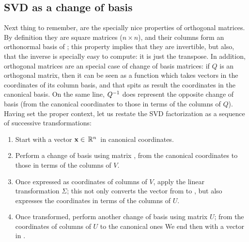 \subsection{SVD as a change of basis}

Next thing to remember, are the specially nice properties of orthogonal
matrices. By definition they are square matrices ($n \times n$), and
their columns form an orthonormal basis of ; this property
implies that they are invertible, but also, that the inverse is
specially easy to compute: it is just the transpose. In addition,
orthogonal matrices are an special case of change of basis matrices:
if $Q$ is an orthogonal matrix, then it can be seen as a function
which takes vectors in the coordinates of its column basis, and that
spits as result the coordinates in the canonical basis. On the same
line, ${Q}^{-1}$ does represent the opposite change of basis
(from the canonical coordinates to those in terms of the columns of
$Q$). \\

Having set the proper context, let us restate the SVD factorization as
a sequence of successive transformations:

\begin{enumerate}
\item Start with a vector $\mathbf{x} \in \,\mathbb{R}^{n}\,$ in canonical coordinates.
\item Perform a change of basis using matrix , from the
  canonical coordinates to those in terms of the columns of $V$.
\item Once expressed as coordinates of columns of $V$, apply the
  linear transformation $\Sigma$; this not only converts the vector
  from  to , but also expresses the coordinates in terms of
  the columns of $U$.
\item Once transformed, perform another change of basis using matrix
  $U$; from the coordinates of columns of $U$ to the canonical ones
  We end then with a vector in .
\end{enumerate}
\hfill
